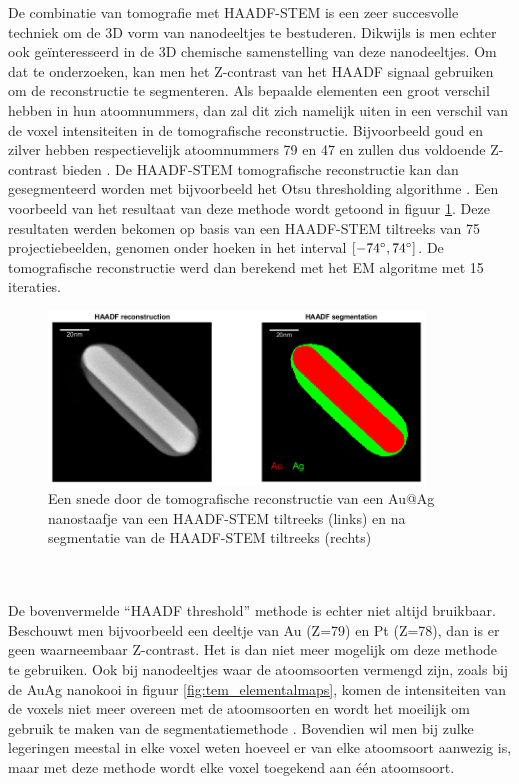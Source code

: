 \documentclass{report}
\begin{document}
De combinatie van tomografie met HAADF-STEM is een zeer succesvolle techniek om de 3D vorm van nanodeeltjes te bestuderen. Dikwijls is men echter ook geïnteresseerd in de 3D chemische samenstelling van deze nanodeeltjes. Om dat te onderzoeken, kan men het Z-contrast van het HAADF signaal gebruiken om de reconstructie te segmenteren. Als bepaalde elementen een groot verschil hebben in hun atoomnummers, dan zal dit zich namelijk uiten in een verschil van de voxel intensiteiten in de tomografische reconstructie. Bijvoorbeeld goud en zilver hebben respectievelijk atoomnummers 79 en 47 en zullen dus voldoende Z-contrast bieden \cite{book:williamscarter, paper:alloysegmentation}. De HAADF-STEM tomografische reconstructie kan dan gesegmenteerd worden met bijvoorbeeld het Otsu thresholding algorithme \cite{paper:otsu}. Een voorbeeld van het resultaat van deze methode wordt getoond in figuur \ref{fig:tem_reconstruction_haadf}. Deze resultaten werden bekomen op basis van een HAADF-STEM tiltreeks van 75 projectiebeelden, genomen onder hoeken in het interval $[-74\degree,74\degree]$. De tomografische reconstructie werd dan berekend met het EM algoritme met 15 iteraties.
\begin{figure}[h!]
	\centering
	\includegraphics[width=10cm]{images/tem/reconstruction_haadf.png}
	\caption{Een snede door de tomografische reconstructie van een Au@Ag nanostaafje van een HAADF-STEM tiltreeks (links) en na segmentatie van de HAADF-STEM tiltreeks (rechts)}
	\label{fig:tem_reconstruction_haadf}
\end{figure}
\\ \\
De bovenvermelde ``HAADF threshold'' methode is echter niet altijd bruikbaar. Beschouwt men bijvoorbeeld een deeltje van Au (Z=79) en Pt (Z=78), dan is er geen waarneembaar Z-contrast. Het is dan niet meer mogelijk om deze methode te gebruiken. Ook bij nanodeeltjes waar de atoomsoorten vermengd zijn, zoals bij de AuAg nanokooi in figuur \ref{fig:tem_elementalmaps}, komen de intensiteiten van de voxels niet meer overeen met de atoomsoorten en wordt het moeilijk om gebruik te maken van de segmentatiemethode \cite{paper:alloysegmentation}. Bovendien wil men bij zulke legeringen meestal in elke voxel weten hoeveel er van elke atoomsoort aanwezig is, maar met deze methode wordt elke voxel toegekend aan één atoomsoort.
\end{document}
